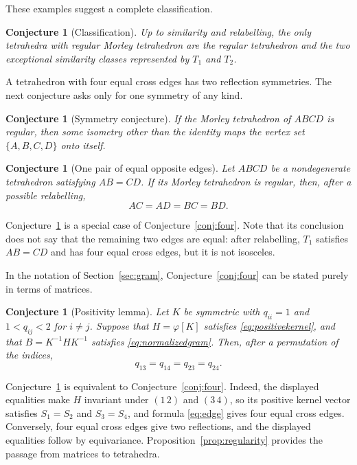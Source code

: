 \documentclass[11pt]{article}
\newtheorem{conjecture}[theorem]{Conjecture}
\theoremstyle{definition}
\theoremstyle{remark}
\newcommand{\ph}{\varphi}
\begin{document}
These examples suggest a complete classification.

\begin{conjecture}[Classification]\label{conj:classification}
Up to similarity and relabelling, the only tetrahedra with regular Morley tetrahedron are the regular tetrahedron and the two exceptional similarity classes represented by $T_1$ and $T_2$.
\end{conjecture}

A tetrahedron with four equal cross edges has two reflection symmetries. The next conjecture asks only for one symmetry of any kind.

\begin{conjecture}[Symmetry conjecture]\label{conj:symmetry}
If the Morley tetrahedron of $ABCD$ is regular, then some isometry other than the identity maps the vertex set $\{A,B,C,D\}$ onto itself.
\end{conjecture}

\begin{conjecture}[One pair of equal opposite edges]
\label{conj:onepair}
Let $ABCD$ be a nondegenerate tetrahedron satisfying $AB=CD$. If its Morley tetrahedron is regular, then, after a possible relabelling,
\[
AC=AD=BC=BD.
\]
\end{conjecture}

Conjecture~\ref{conj:onepair} is a special case of Conjecture~\ref{conj:four}. Note that its conclusion does not say that the remaining two edges are equal: after relabelling, $T_1$ satisfies $AB=CD$ and has four equal cross edges, but it is not isosceles.

In the notation of Section~\ref{sec:gram}, Conjecture~\ref{conj:four} can be stated purely in terms of matrices.

\begin{conjecture}[Positivity lemma]
\label{conj:positivity}
Let $K$ be symmetric with $q_{ii}=1$ and $1<q_{ij}<2$ for $i\ne j$. Suppose that $H=\ph[K]$ satisfies \eqref{eq:positivekernel}, and that $B=K^{-1}HK^{-1}$ satisfies \eqref{eq:normalizedgram}. Then, after a permutation of the indices,
\[
q_{13}=q_{14}=q_{23}=q_{24}.
\]
\end{conjecture}

Conjecture~\ref{conj:positivity} is equivalent to Conjecture~\ref{conj:four}. Indeed, the displayed equalities make $H$ invariant under $(1\,2)$ and $(3\,4)$, so its positive kernel vector satisfies $S_1=S_2$ and $S_3=S_4$, and formula \eqref{eq:edge} gives four equal cross edges. Conversely, four equal cross edges give two reflections, and the displayed equalities follow by equivariance. Proposition~\ref{prop:regularity} provides the passage from matrices to tetrahedra.
\end{document}
